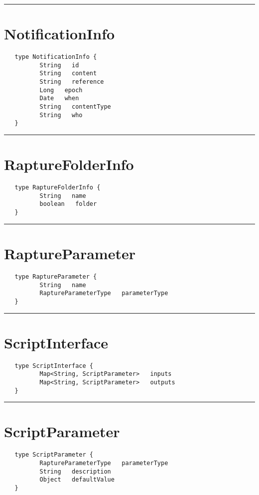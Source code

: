 \rule{15cm}{2pt}
\section{NotificationInfo}
\label{type:NotificationInfo}

\begin{verbatim}
   type NotificationInfo {
          String   id
          String   content
          String   reference
          Long   epoch
          Date   when
          String   contentType
          String   who
   }
\end{verbatim}

\rule{15cm}{2pt}
\section{RaptureFolderInfo}
\label{type:RaptureFolderInfo}

\begin{verbatim}
   type RaptureFolderInfo {
          String   name
          boolean   folder
   }
\end{verbatim}

\rule{15cm}{2pt}
\section{RaptureParameter}
\label{type:RaptureParameter}

\begin{verbatim}
   type RaptureParameter {
          String   name
          RaptureParameterType   parameterType
   }
\end{verbatim}

\rule{15cm}{2pt}
\section{ScriptInterface}
\label{type:ScriptInterface}

\begin{verbatim}
   type ScriptInterface {
          Map<String, ScriptParameter>   inputs
          Map<String, ScriptParameter>   outputs
   }
\end{verbatim}

\rule{15cm}{2pt}
\section{ScriptParameter}
\label{type:ScriptParameter}

\begin{verbatim}
   type ScriptParameter {
          RaptureParameterType   parameterType
          String   description
          Object   defaultValue
   }
\end{verbatim}

